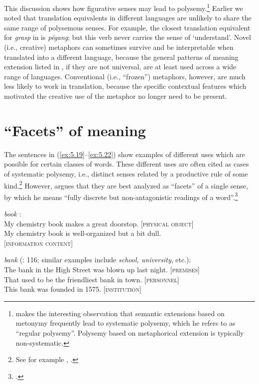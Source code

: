This discussion shows how figurative senses may lead to polysemy.\footnote{\citet[16]{Apresjan1974} makes the interesting observation that semantic extensions based on metonymy frequently lead to systematic polysemy, which he refers to as “regular polysemy”. Polysemy based on metaphorical extension is typically non-systematic.} Earlier we noted that translation equivalents in different languages are unlikely to share the same range of polysemous senses. For example, the closest translation equivalent for \textit{grasp} in  is \textit{pĕgang}; but this verb never carries the sense of ‘understand’. Novel (i.e., creative) metaphors can sometimes survive and be interpretable when translated into a different language, because the general patterns of meaning extension listed in , if they are not universal, are at least used across a wide range of languages. Conventional (i.e., “frozen”) metaphors, however, are much less likely to work in translation, because the specific contextual features which motivated the creative use of the metaphor no longer need to be present. 


\section{“Facets” of meaning}\label{sec:5.5}

The sentences in (\ref{ex:5.19}--\ref{ex:5.22}) show examples of different uses which are possible for certain classes of words. These different uses are often cited as cases of systematic polysemy, i.e., distinct senses related by a productive rule of some kind.\footnote{See for example \citet{Pustejovsky1995}, \citet{NunbergZaenen1992}.} However, \citet{Cruse2000,Cruse2004} argues that they are best analyzed as “facets” of a single sense, by which he means “fully discrete but non-antagonistic readings of a word”.\footnote{\citet[116]{Cruse2000}.}

\ea  \label{ex:5.19}
\textit{book} \citep{Cruse2004}:\\
\ea My chemistry book makes a great doorstop.    \hfill         [\textsc{physical object}] \\
\ex My chemistry book is well-organized but a bit dull. \\
\hfill [\textsc{information content}] \\
                       \z
\z

\ea \label{ex:5.20}
 \textit{bank} (\citealt{Cruse2000}: 116; similar examples include \textit{school, university}, etc.):\\
\ea The bank in the High Street was blown up last night.  \hfill [\textsc{premises}] \\
\ex That used to be the friendliest bank in town.  \hfill         [\textsc{personnel}] \\
\ex This bank was founded in 1575.                        \hfill [\textsc{institution}] \\
                       \z
\z

